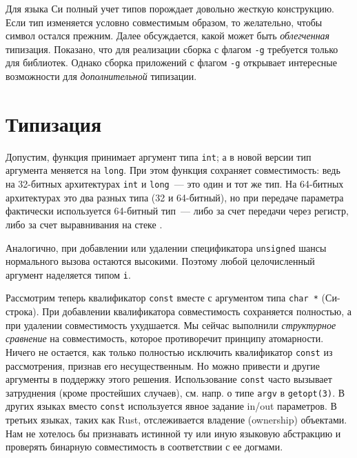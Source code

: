 \documentclass[russian,a4paper,12pt]{article}
\begin{document}
Для языка Си полный учет типов порождает довольно жесткую конструкцию.  Если тип
изменяется условно совместимым образом, то желательно, чтобы символ остался прежним.
Далее обсуждается, какой может быть \textit{облегченная} типизация.  Показано,
что для реализации сборка с флагом \verb|-g| требуется только для библиотек.
Однако сборка приложений с флагом \verb|-g| открывает интересные возможности
для \textit{дополнительной} типизации.

\section{Типизация}
Допустим, функция принимает аргумент типа \verb|int|; а в новой версии тип аргумента
меняется на \verb|long|.  При этом функция сохраняет совместимость: ведь на 32-битных
архитектурах \verb|int| и \verb|long|~--- это один и тот же тип.  На 64-битных архитектурах
это два разных типа (32 и 64-битный), но при передаче параметра фактически используется
64-битный тип~--- либо за счет передачи через регистр, либо за счет выравнивания на стеке
\cite[с.\,23]{AMD64ABI}.
\begin{comment}
При этом возникает хороший вопрос: а не будет у нас мусора в старших битах?
По крайней мере на x86-64 мусора не появляется, потому что "mov eax" автоматически
очищает старшие биты.  Проверим, насколько серьезна проблема мусора в других случаях:
\begin{verbatim}
$ cat lib.c
#include <stdio.h>
void func(LIB_TYPE arg) { printf("%ld\n", (long) arg); }
$ cat main.c
extern void func(MAIN_TYPE arg);
int main() { func(666); return 0; }
$ gcc -m32 -DMAIN_TYPE=short -DLIB_TYPE=int -O main.c lib.c && ./a.out
666
\end{verbatim}
Вроде нету мусора.
\end{comment}
Аналогично, при добавлении или удалении спецификатора \verb|unsigned|
шансы нормального вызова остаются высокими.  Поэтому любой целочисленный
аргумент наделяется типом \verb|i|.

Рассмотрим теперь квалификатор \verb|const| вместе с аргументом типа \verb|char *| (Си-строка).
При добавлении квалификатора совместимость сохраняется полностью, а при удалении совместимость
ухудшается.  Мы сейчас выполнили \textit{структурное сравнение} на совместимость, которое противоречит
принципу атомарности.  Ничего не остается, как только полностью исключить квалификатор \verb|const|
из рассмотрения, признав его несущественным.  Но можно привести и другие аргументы в поддержку
этого решения.
Использование \verb|const| часто вызывает затруднения (кроме простейших случаев),
см. напр. о типе \verb|argv| в \verb|getopt(3)|.
В других языках вместо \verb|const| используется явное задание in/out параметров.
В третьих языках, таких как Rust, отслеживается владение (ownership) объектами.
Нам не хотелось бы признавать истинной ту или иную языковую абстракцию и проверять
бинарную совместимость в соответствии с ее догмами.
\end{document}
